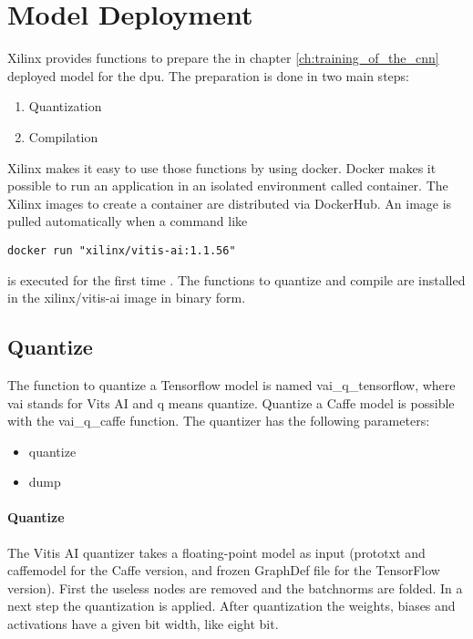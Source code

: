 \section{Model Deployment}
\label{sec:embedded_platform:model_deployment}
Xilinx provides functions to prepare the in chapter \ref{ch:training_of_the_cnn} deployed model for the \acrshort{dpu}.
The preparation is done in two main steps:
\begin{enumerate}
	\item Quantization
	\item Compilation
\end{enumerate}
Xilinx makes it easy to use those functions by using docker.
Docker makes it possible to run an application in an isolated environment called container.
The Xilinx images to create a container are distributed via DockerHub.
An image is pulled automatically when a command like
\begin{lstlisting}[style=bash, caption={}, label=lst:pull_img]
  docker run "xilinx/vitis-ai:1.1.56"
\end{lstlisting}
is executed for the first time \cite{docker_overview}.
The functions to quantize and compile are installed in the xilinx/vitis-ai image in binary form.

\subsection{Quantize}
\label{subsec:embedded_platform:model_deployment:quantize}
The function to quantize a Tensorflow model is named vai\_q\_tensorflow, where vai stands for Vits AI and q means quantize.
Quantize a Caffe model is possible with the vai\_q\_caffe function.
The quantizer has the following parameters:
\begin{itemize}
	\item quantize
	\item dump
\end{itemize}

\paragraph{Quantize}
The Vitis AI quantizer takes a floating-point model as input (prototxt and caffemodel for the
Caffe version, and frozen GraphDef file for the TensorFlow version).
First the useless nodes are removed and the batchnorms are folded.
In a next step the quantization is applied.
After quantization the weights, biases and activations have a given bit width, like eight bit.

